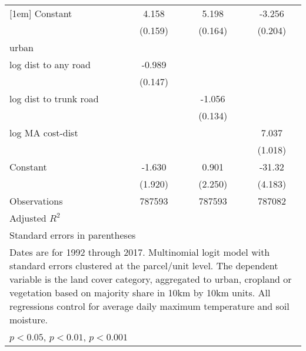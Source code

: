 \begin{table}[htbp]
\begin{tabular}{l*{3}{c}}
[1em]
Constant            &       4.158\sym{***}&       5.198\sym{***}&      -3.256\sym{***}\\
                    &     (0.159)         &     (0.164)         &     (0.204)         \\
\hline
urban               &                     &                     &                     \\
log dist to any road&      -0.989\sym{***}&                     &                     \\
                    &     (0.147)         &                     &                     \\
[1em]
log dist to trunk road&                     &      -1.056\sym{***}&                     \\
                    &                     &     (0.134)         &                     \\
[1em]
log MA cost-dist    &                     &                     &       7.037\sym{***}\\
                    &                     &                     &     (1.018)         \\
[1em]
Constant            &      -1.630         &       0.901         &      -31.32\sym{***}\\
                    &     (1.920)         &     (2.250)         &     (4.183)         \\
\hline
Observations        &      787593         &      787593         &      787082         \\
Adjusted \(R^{2}\)  &                     &                     &                     \\
\hline\hline
\multicolumn{4}{l}{\footnotesize Standard errors in parentheses}\\
\multicolumn{4}{l}{\footnotesize Dates are for 1992 through 2017. Multinomial logit model with standard errors clustered at the parcel/unit level. The dependent variable is the land cover category, aggregated to urban, cropland or vegetation based on majority share in 10km by 10km units. All regressions control for average daily maximum temperature and soil moisture.}\\
\multicolumn{4}{l}{\footnotesize \sym{*} \(p<0.05\), \sym{**} \(p<0.01\), \sym{***} \(p<0.001\)}\\
\end{tabular}
\end{table}
